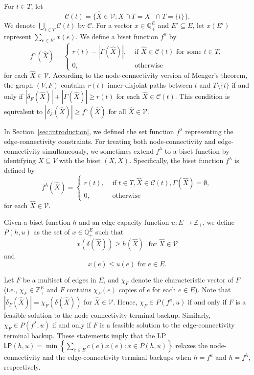 \documentclass{article}
\newcommand{\Cfam}{\mathcal{C}}
\newcommand{\Vfam}{\mathcal{V}}
\newcommand{\Zset}{\mathbb{Z}}
\newcommand{\Rset}{\mathbb{Q}}
\newcommand{\cut}{P}
\newcommand{\lp}{\mathsf{LP}}
\newcommand{\f}{f^{\kappa}}
\newcommand{\g}{f^{\lambda}}
\begin{document}
For $t \in T$, let 
\[
\Cfam(t)=\{\hat{X}\in \Vfam \colon X\cap T=X^+\cap T=\{t\}\}.
\]
We denote $\bigcup_{t \in T}\Cfam(t)$ by $\Cfam$.
For a vector $x \in \Rset_+^E$ and $E' \subseteq E$, 
let $x(E')$ represent $\sum_{e \in E'}x(e)$.
We define a biset function $\f$ by
 \[
   \f(\hat{X}) = 
   \begin{cases}
     r(t)-|\Gamma(\hat{X})|, &\text{ if } \hat{X} \in \Cfam(t) \text{ for some } t \in T,\\
     0, &\text{ otherwise }
   \end{cases}
 \]
for each $\hat{X} \in \Vfam$.
According to the node-connectivity version of Menger's theorem, 
the graph $(V,F)$ contains $r(t)$ inner-disjoint paths between $t$ and $T\setminus
\{t\}$
if and only if
$|\delta_{F}(\hat{X})| + |\Gamma(\hat{X})| \geq r(t)$ 
for each $\hat{X} \in \Cfam(t)$.
This condition is equivalent to $|\delta_{F}(\hat{X})| \geq \f(\hat{X})$
for all $\hat{X} \in \Vfam$.

In Section~\ref{sec:introduction},
we defined the set function $\g$ representing 
the edge-connectivity constraints.
For treating both node-connectivity and edge-connectivity simultaneously,
we sometimes extend
$\g$ to a biset function by
identifying $X\subseteq V$ with the biset $(X,X)$.
Specifically, the biset function $\g$ is defined by
\[
  \g(\hat{X}) = 
  \begin{cases}
    r(t), &\text{ if }  t \in T, \hat{X} \in \Cfam(t),
    \Gamma(\hat{X})=\emptyset,\\
    0, &\text{ otherwise }
  \end{cases}
\]
for each $\hat{X} \in \Vfam$.

Given a biset function $h$ and 
an edge-capacity function
$u\colon E \rightarrow \Zset_+$,
we define $\cut(h,u)$ as the set of 
$x \in \Rset_+^E$ such that 
\begin{equation}\label{eq:t-cut}
x(\delta(\hat{X})) \geq h(\hat{X})  \ \ \ \mbox{for $\hat{X}\in \Vfam$}
\end{equation}
and 
\[
x(e) \leq u(e) \text{ for } e \in E.
\]

Let $F$ be a multiset of edges in $E$, and $\chi_F$ denote the characteristic vector of $F$
(i.e., $\chi_F \in \Zset_+^E$ and $F$ contains $\chi_F(e)$ copies of $e$ for each $e \in E$).
Note that $|\delta_F(\hat{X})| = \chi_F(\delta(\hat{X}))$ for $\hat{X} \in \Vfam$.
Hence, $\chi_F \in \cut(\f,u)$
if and only if $F$ is a feasible solution
to the node-connectivity terminal backup.
Similarly, $\chi_F \in \cut(\g,u)$
if and only if $F$ is a feasible solution 
to the edge-connectivity terminal backup.
These statements imply that the LP 
 $\lp(h,u)=\min \left\{ \sum_{e\in E} c(e)x(e) \colon x \in \cut(h,u) \right\}$
relaxes the node-connectivity and the edge-connectivity terminal backups 
when $h=\f$ and $h=\g$, respectively.
\end{document}
